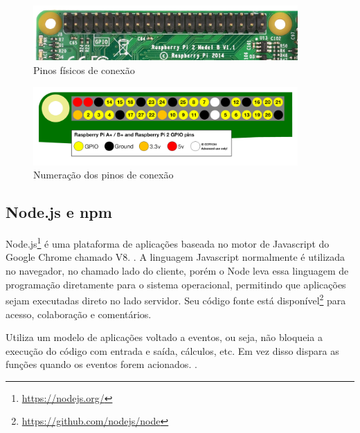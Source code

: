 \begin{figure}[htb]
	\caption{\label{fig:gpio-pins-pi2}Pinos físicos de conexão}
	\begin{center}
		\includegraphics[width=0.9\textwidth]{img/gpio-pins-pi2.jpg}
	\end{center}
\end{figure}

\begin{figure}[htb]
	\caption{\label{fig:gpio-numbers-pi2}Numeração dos pinos de conexão}
	\begin{center}
		\includegraphics[width=0.9\textwidth]{img/gpio-numbers-pi2.png}
	\end{center}
\end{figure}


\subsection{Node.js e npm}\label{sec:node-js}

Node.js\footnote{\url{https://nodejs.org/}} é uma plataforma de aplicações baseada no motor de Javascript do Google Chrome chamado V8. \cite{o-que-e-node}. A linguagem Javascript normalmente é utilizada no navegador, no chamado lado do cliente, porém o Node leva essa linguagem de programação diretamente para o sistema operacional, permitindo que aplicações sejam executadas direto no lado servidor. Seu código fonte está disponível\footnote{\url{https://github.com/nodejs/node}} para acesso, colaboração e comentários.

Utiliza um modelo de aplicações voltado a eventos, ou seja, não bloqueia a execução do código com entrada e saída, cálculos, etc. Em vez disso dispara as funções quando os eventos forem acionados. \cite{o-que-e-node}.


